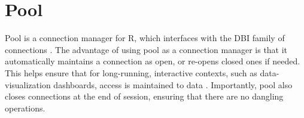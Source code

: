 \section{Pool}

Pool is a connection manager for R, which interfaces with the DBI family of
connections \cite{hid-sp18-403-R-dbi}. The advantage of using pool as a
connection manager is that it automatically maintains a connection as open, or
re-opens closed ones if needed. This helps ensure that for long-running,
interactive contexts, such as data-visualization dashboards, access is
maintained to data \cite{hid-sp18-403-R-pool}. Importantly, pool also closes
connections at the end of session, ensuring that there are no dangling
operations.

